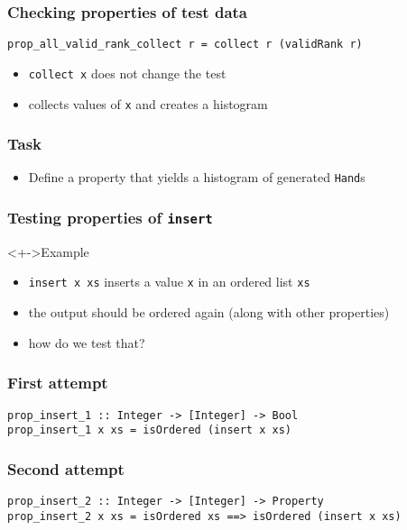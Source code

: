 \documentclass{beamer}
\begin{document}
\begin{frame}[fragile]
  \frametitle{Checking properties of test data}
\begin{verbatim}
prop_all_valid_rank_collect r = collect r (validRank r)
\end{verbatim}
  \begin{itemize}
  \item \texttt{collect x} does not change the test
  \item collects values of \texttt{x} and creates a histogram
  \end{itemize}
\end{frame}
\begin{frame}[fragile]
  \frametitle{Task}
  \begin{itemize}
  \item Define a property that yields a histogram of generated \texttt{Hand}s
  \end{itemize}
\end{frame}
\begin{frame}
  \frametitle{Testing properties of \texttt{insert}}
  \onslide<+->{}
  \begin{block}<+->{Example}
  \begin{itemize}
  \item \texttt{insert x xs} inserts a value \texttt{x} in an ordered list \texttt{xs}
  \item the output should be ordered again (along with other properties)
  \item how do we test that?
  \end{itemize}
\end{block}
\end{frame}
\begin{frame}[fragile]
  \frametitle{First attempt}
\begin{verbatim}
prop_insert_1 :: Integer -> [Integer] -> Bool
prop_insert_1 x xs = isOrdered (insert x xs)
\end{verbatim}
\end{frame}
\begin{frame}[fragile]
  \frametitle{Second attempt}
\begin{verbatim}
prop_insert_2 :: Integer -> [Integer] -> Property
prop_insert_2 x xs = isOrdered xs ==> isOrdered (insert x xs)
\end{verbatim}
\end{frame}
\end{document}
